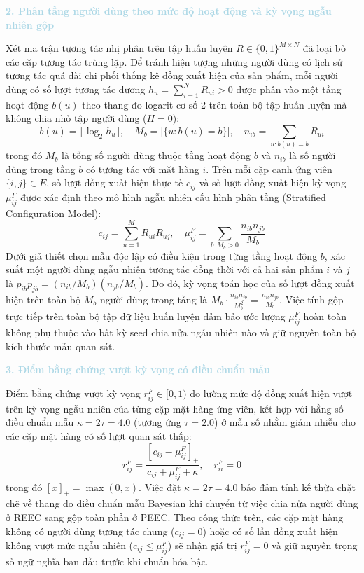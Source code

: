 \noindent\textcolor{lightblue}{\textbf{2. Phân tầng người dùng theo mức độ hoạt động và kỳ vọng ngẫu nhiên gộp}}

Xét ma trận tương tác nhị phân trên tập huấn luyện $R \in \{0, 1\}^{M \times N}$ đã loại bỏ các cặp tương tác trùng lặp. Để tránh hiện tượng những người dùng có lịch sử tương tác quá dài chi phối thống kê đồng xuất hiện của sản phẩm, mỗi người dùng có số lượt tương tác dương $h_u = \sum_{i=1}^{N} R_{ui} > 0$ được phân vào một tầng hoạt động $b(u)$ theo thang đo logarit cơ số 2 trên toàn bộ tập huấn luyện mà không chia nhỏ tập người dùng ($H = 0$):
\begin{equation}
b(u) = \lfloor \log_2 h_u \rfloor, \quad M_b = |\{u : b(u) = b\}|, \quad n_{ib} = \sum_{u : b(u) = b} R_{ui}
\end{equation}
trong đó $M_b$ là tổng số người dùng thuộc tầng hoạt động $b$ và $n_{ib}$ là số người dùng trong tầng $b$ có tương tác với mặt hàng $i$. Trên mỗi cặp cạnh ứng viên $\{i, j\} \in E$, số lượt đồng xuất hiện thực tế $c_{ij}$ và số lượt đồng xuất hiện kỳ vọng $\mu_{ij}^F$ được xác định theo mô hình ngẫu nhiên cấu hình phân tầng (Stratified Configuration Model):
\begin{equation}
c_{ij} = \sum_{u=1}^{M} R_{ui} R_{uj}, \quad \mu_{ij}^F = \sum_{b : M_b > 0} \frac{n_{ib} n_{jb}}{M_b}
\end{equation}
Dưới giả thiết chọn mẫu độc lập có điều kiện trong từng tầng hoạt động $b$, xác suất một người dùng ngẫu nhiên tương tác đồng thời với cả hai sản phẩm $i$ và $j$ là $p_{ib} p_{jb} = (n_{ib}/M_b)(n_{jb}/M_b)$. Do đó, kỳ vọng toán học của số lượt đồng xuất hiện trên toàn bộ $M_b$ người dùng trong tầng là $M_b \cdot \frac{n_{ib} n_{jb}}{M_b^2} = \frac{n_{ib} n_{jb}}{M_b}$. Việc tính gộp trực tiếp trên toàn bộ tập dữ liệu huấn luyện đảm bảo ước lượng $\mu_{ij}^F$ hoàn toàn không phụ thuộc vào bất kỳ seed chia nửa ngẫu nhiên nào và giữ nguyên toàn bộ kích thước mẫu quan sát.

\noindent\textcolor{lightblue}{\textbf{3. Điểm bằng chứng vượt kỳ vọng có điều chuẩn mẫu}}

Điểm bằng chứng vượt kỳ vọng $r_{ij}^F \in [0, 1)$ đo lường mức độ đồng xuất hiện vượt trên kỳ vọng ngẫu nhiên của từng cặp mặt hàng ứng viên, kết hợp với hằng số điều chuẩn mẫu $\kappa = 2\tau = 4.0$ (tương ứng $\tau = 2.0$) ở mẫu số nhằm giảm nhiễu cho các cặp mặt hàng có số lượt quan sát thấp:
\begin{equation}
r_{ij}^F = \frac{[c_{ij} - \mu_{ij}^F]_+}{c_{ij} + \mu_{ij}^F + \kappa}, \quad r_{ii}^F = 0
\end{equation}
trong đó $[x]_+ = \max(0, x)$. Việc đặt $\kappa = 2\tau = 4.0$ bảo đảm tính kế thừa chặt chẽ về thang đo điều chuẩn mẫu Bayesian khi chuyển từ việc chia nửa người dùng ở REEC sang gộp toàn phần ở PEEC. Theo công thức trên, các cặp mặt hàng không có người dùng tương tác chung ($c_{ij} = 0$) hoặc có số lần đồng xuất hiện không vượt mức ngẫu nhiên ($c_{ij} \le \mu_{ij}^F$) sẽ nhận giá trị $r_{ij}^F = 0$ và giữ nguyên trọng số ngữ nghĩa ban đầu trước khi chuẩn hóa bậc.

